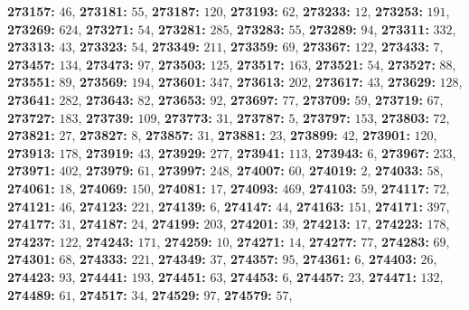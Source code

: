 \textsf{\bfseries 273157:} $46$, \textsf{\bfseries 273181:} $55$, \textsf{\bfseries 273187:} $120$, \textsf{\bfseries 273193:} $62$, \textsf{\bfseries 273233:} $12$, \textsf{\bfseries 273253:} $191$, \textsf{\bfseries 273269:} $624$, \textsf{\bfseries 273271:} $54$, \textsf{\bfseries 273281:} $285$, \textsf{\bfseries 273283:} $55$, \textsf{\bfseries 273289:} $94$, \textsf{\bfseries 273311:} $332$, \textsf{\bfseries 273313:} $43$, \textsf{\bfseries 273323:} $54$, \textsf{\bfseries 273349:} $211$, \textsf{\bfseries 273359:} $69$, \textsf{\bfseries 273367:} $122$, \textsf{\bfseries 273433:} $7$, \textsf{\bfseries 273457:} $134$, \textsf{\bfseries 273473:} $97$, \textsf{\bfseries 273503:} $125$, \textsf{\bfseries 273517:} $163$, \textsf{\bfseries 273521:} $54$, \textsf{\bfseries 273527:} $88$, \textsf{\bfseries 273551:} $89$, \textsf{\bfseries 273569:} $194$, \textsf{\bfseries 273601:} $347$, \textsf{\bfseries 273613:} $202$, \textsf{\bfseries 273617:} $43$, \textsf{\bfseries 273629:} $128$, \textsf{\bfseries 273641:} $282$, \textsf{\bfseries 273643:} $82$, \textsf{\bfseries 273653:} $92$, \textsf{\bfseries 273697:} $77$, \textsf{\bfseries 273709:} $59$, \textsf{\bfseries 273719:} $67$, \textsf{\bfseries 273727:} $183$, \textsf{\bfseries 273739:} $109$, \textsf{\bfseries 273773:} $31$, \textsf{\bfseries 273787:} $5$, \textsf{\bfseries 273797:} $153$, \textsf{\bfseries 273803:} $72$, \textsf{\bfseries 273821:} $27$, \textsf{\bfseries 273827:} $8$, \textsf{\bfseries 273857:} $31$, \textsf{\bfseries 273881:} $23$, \textsf{\bfseries 273899:} $42$, \textsf{\bfseries 273901:} $120$, \textsf{\bfseries 273913:} $178$, \textsf{\bfseries 273919:} $43$, \textsf{\bfseries 273929:} $277$, \textsf{\bfseries 273941:} $113$, \textsf{\bfseries 273943:} $6$, \textsf{\bfseries 273967:} $233$, \textsf{\bfseries 273971:} $402$, \textsf{\bfseries 273979:} $61$, \textsf{\bfseries 273997:} $248$, \textsf{\bfseries 274007:} $60$, \textsf{\bfseries 274019:} $2$, \textsf{\bfseries 274033:} $58$, \textsf{\bfseries 274061:} $18$, \textsf{\bfseries 274069:} $150$, \textsf{\bfseries 274081:} $17$, \textsf{\bfseries 274093:} $469$, \textsf{\bfseries 274103:} $59$, \textsf{\bfseries 274117:} $72$, \textsf{\bfseries 274121:} $46$, \textsf{\bfseries 274123:} $221$, \textsf{\bfseries 274139:} $6$, \textsf{\bfseries 274147:} $44$, \textsf{\bfseries 274163:} $151$, \textsf{\bfseries 274171:} $397$, \textsf{\bfseries 274177:} $31$, \textsf{\bfseries 274187:} $24$, \textsf{\bfseries 274199:} $203$, \textsf{\bfseries 274201:} $39$, \textsf{\bfseries 274213:} $17$, \textsf{\bfseries 274223:} $178$, \textsf{\bfseries 274237:} $122$, \textsf{\bfseries 274243:} $171$, \textsf{\bfseries 274259:} $10$, \textsf{\bfseries 274271:} $14$, \textsf{\bfseries 274277:} $77$, \textsf{\bfseries 274283:} $69$, \textsf{\bfseries 274301:} $68$, \textsf{\bfseries 274333:} $221$, \textsf{\bfseries 274349:} $37$, \textsf{\bfseries 274357:} $95$, \textsf{\bfseries 274361:} $6$, \textsf{\bfseries 274403:} $26$, \textsf{\bfseries 274423:} $93$, \textsf{\bfseries 274441:} $193$, \textsf{\bfseries 274451:} $63$, \textsf{\bfseries 274453:} $6$, \textsf{\bfseries 274457:} $23$, \textsf{\bfseries 274471:} $132$, \textsf{\bfseries 274489:} $61$, \textsf{\bfseries 274517:} $34$, \textsf{\bfseries 274529:} $97$, \textsf{\bfseries 274579:} $57$, 
